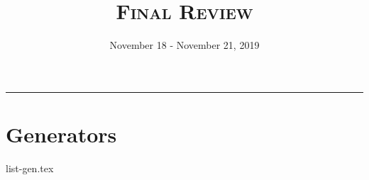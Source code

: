 \documentclass{exam}
\title{\textsc{Final Review}}
\date{November 18 - November 21, 2019}
\begin{document}
\maketitle\rule{\textwidth}{0.15em}
\fontsize{12}{15}\selectfont

\section{Generators}
\begin{questions}
{list-gen.tex}

\end{questions}
\end{document}
